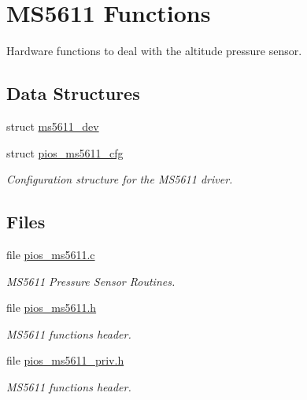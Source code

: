 \hypertarget{group___p_i_o_s___m_s5611}{\section{\-M\-S5611 \-Functions}
\label{group___p_i_o_s___m_s5611}
}


\-Hardware functions to deal with the altitude pressure sensor.  


\subsection*{\-Data \-Structures}
\begin{DoxyCompactItemize}
\item 
struct \hyperlink{structms5611__dev}{ms5611\-\_\-dev}
\item 
struct \hyperlink{structpios__ms5611__cfg}{pios\-\_\-ms5611\-\_\-cfg}
\begin{DoxyCompactList}\small\item\em \-Configuration structure for the \-M\-S5611 driver. \end{DoxyCompactList}\end{DoxyCompactItemize}
\subsection*{\-Files}
\begin{DoxyCompactItemize}
\item 
file \hyperlink{pios__ms5611_8c}{pios\-\_\-ms5611.\-c}
\begin{DoxyCompactList}\small\item\em \-M\-S5611 \-Pressure \-Sensor \-Routines. \end{DoxyCompactList}\item 
file \hyperlink{pios__ms5611_8h}{pios\-\_\-ms5611.\-h}
\begin{DoxyCompactList}\small\item\em \-M\-S5611 functions header. \end{DoxyCompactList}\item 
file \hyperlink{pios__ms5611__priv_8h}{pios\-\_\-ms5611\-\_\-priv.\-h}
\begin{DoxyCompactList}\small\item\em \-M\-S5611 functions header. \end{DoxyCompactList}\end{DoxyCompactItemize}
